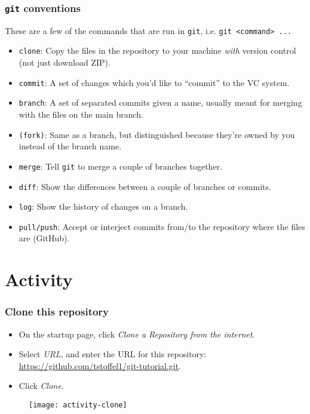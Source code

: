 \documentclass[9pt]{beamer}
\begin{document}
%
\begin{frame}
  \frametitle{\texttt{git} conventions}
  These are a few of the commands that are run in \texttt{git}, i.e. \texttt{git <command> ...}
  \begin{itemize}
    \item \texttt{clone}: Copy the files in the repository to your machine \emph{with} version control (not just download ZIP). \pause
    \item \texttt{commit}: A set of changes which you'd like to ``commit'' to the VC system. \pause
    \item \texttt{branch}: A set of separated commits given a name, usually meant for merging with the files on the main branch. \pause
    \item \texttt{(fork)}: Same as a branch, but distinguished because they're owned by you instead of the branch name. \pause
    \item \texttt{merge}: Tell \texttt{git} to merge a couple of branches together. \pause
    \item \texttt{diff}: Show the differences between a couple of branches or commits. \pause
    \item \texttt{log}: Show the history of changes on a branch. \pause
    \item \texttt{pull/push}: Accept or interject commits from/to the repository where the files are (GitHub). \pause
  \end{itemize}
\end{frame}
%
\section{Activity}
%
\begin{frame}
  \frametitle{Clone this repository}
  \begin{itemize}
    \item On the startup page, click \emph{Clone a Repository from the internet}.
    \item Select \emph{URL}, and enter the URL for this repository: \url{https://github.com/tstoffel1/git-tutorial.git}.
    \item Click \emph{Clone}.
  \end{itemize}
  \begin{figure}
    \centering
    \texttt{[image: activity-clone]}
  \end{figure}
\end{frame}
%
\end{document}
